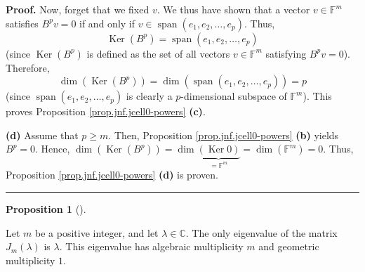 \documentclass[numbers=enddot,12pt,final,onecolumn,notitlepage]{scrartcl}%
\numberwithin{exer}{subsection}
\theoremstyle{definition}
\newtheorem{prop}[theo]{Proposition}
\newenvironment{proposition}[1][]
{\begin{prop}[#1]\begin{leftbar}}
{\end{leftbar}\end{prop}}
\newenvironment{proof}[1][Proof]{\noindent\textbf{#1.} }{\ \rule{0.5em}{0.5em}}
\begin{document}
\begin{proof}
Now, forget that we fixed $v$. We thus have shown that a vector $v\in
\mathbb{F}^{m}$ satisfies $B^{p}v=0$ if and only if $v\in\operatorname*{span}%
\left(  e_{1},e_{2},\ldots,e_{p}\right)  $. Thus,
\[
\operatorname*{Ker}\left(  B^{p}\right)  =\operatorname*{span}\left(
e_{1},e_{2},\ldots,e_{p}\right)
\]
(since $\operatorname*{Ker}\left(  B^{p}\right)  $ is defined as the set of
all vectors $v\in\mathbb{F}^{m}$ satisfying $B^{p}v=0$). Therefore,%
\[
\dim\left(  \operatorname*{Ker}\left(  B^{p}\right)  \right)  =\dim\left(
\operatorname*{span}\left(  e_{1},e_{2},\ldots,e_{p}\right)  \right)  =p
\]
(since $\operatorname*{span}\left(  e_{1},e_{2},\ldots,e_{p}\right)  $ is
clearly a $p$-dimensional subspace of $\mathbb{F}^{m}$). This proves
Proposition \ref{prop.jnf.jcell0-powers} \textbf{(c)}. \medskip

\textbf{(d)} Assume that $p\geq m$. Then, Proposition
\ref{prop.jnf.jcell0-powers} \textbf{(b)} yields $B^{p}=0$. Hence,
$\dim\left(  \operatorname*{Ker}\left(  B^{p}\right)  \right)  =\dim
\underbrace{\left(  \operatorname*{Ker}0\right)  }_{=\mathbb{F}^{m}}%
=\dim\left(  \mathbb{F}^{m}\right)  =0$. Thus, Proposition
\ref{prop.jnf.jcell0-powers} \textbf{(d)} is proven.
\end{proof}

\begin{proposition}
\label{prop.jnf.jcell.multiplicity}Let $m$ be a positive integer, and let
$\lambda\in\mathbb{C}$. The only eigenvalue of the matrix $J_{m}\left(
\lambda\right)  $ is $\lambda$. This eigenvalue has algebraic multiplicity $m$
and geometric multiplicity $1$.
\end{proposition}
\end{document}
